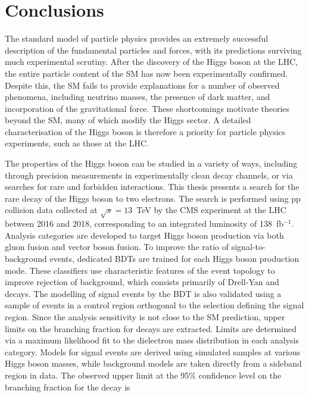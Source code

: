 \chapter{Conclusions}
\label{chap:conclusions}


The standard model of particle physics provides an extremely successful description of the fundamental particles and forces, with its predictions surviving much experimental scrutiny. After the discovery of the Higgs boson at the LHC, the entire particle content of the SM has now been experimentally confirmed. Despite this, the SM fails to provide explanations for a number of observed phenomena, including neutrino masses, the presence of dark matter, and incorporation of the gravitational force. These shortcomings motivate theories beyond the SM, many of which modify the Higgs sector. A detailed characterisation of the Higgs boson is therefore a priority for particle physics experiments, such as those at the LHC.

The properties of the Higgs boson can be studied in a variety of ways, including through precision measurements in experimentally clean decay channels, or via searches for rare and forbidden interactions. This thesis presents a search for the rare decay of the Higgs boson to two electrons. The search is performed using pp collision data collected at $\sqrt{s}=13$~TeV by the CMS experiment at the LHC between 2016 and 2018, corresponding to an integrated luminosity of 138~fb$^{-1}$. Analysis categories are developed to target Higgs boson production via both gluon fusion and vector boson fusion. To improve the ratio of signal-to-background events, dedicated BDTs are trained for each Higgs boson production mode. These classifiers use characteristic features of the event topology to improve rejection of background, which consists primarily of Drell-Yan \Zee and \ttbar decays. The modelling of signal events by the BDT is also validated using a sample of \Zee events in a control region orthogonal to the selection defining the signal region. Since the analysis sensitivity is not close to the SM prediction, upper limits on the branching fraction for \Hee decays are extracted. Limits are determined via a maximum likelihood fit to the dielectron mass distribution in each analysis category. Models for signal events are derived using simulated samples at various Higgs boson masses, while background models are taken directly from a sideband region in data. The observed upper limit at the 95\% confidence level on the branching fraction for the \Hee decay is

